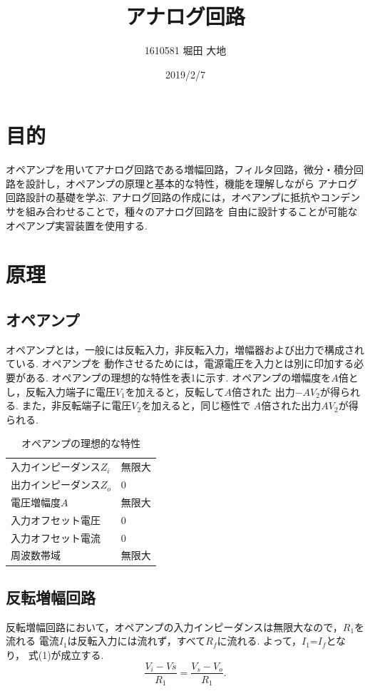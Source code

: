\documentclass[twocolumn, 10pt,a4j]{jsarticle}
\title{\vspace{-2.5cm}アナログ回路}
\author{1610581 堀田 大地}
\date{2019/2/7}
\begin{document}
\maketitle{}
\section{目的}
  オペアンプを用いてアナログ回路である増幅回路，フィルタ回路，微分・積分回路を設計し，オペアンプの原理と基本的な特性，機能を理解しながら
  アナログ回路設計の基礎を学ぶ. アナログ回路の作成には，オペアンプに抵抗やコンデンサを組み合わせることで，種々のアナログ回路を
  自由に設計することが可能なオペアンプ実習装置を使用する.

\section{原理}
  \subsection{オペアンプ}
  オペアンプとは，一般には反転入力，非反転入力，増幅器および出力で構成されている. オペアンプを
  動作させるためには，電源電圧を入力とは別に印加する必要がある. オペアンプの理想的な特性を表1に示す.
  オペアンプの増幅度を$A$倍とし，反転入力端子に電圧$V_{1}$を加えると，反転して$A$倍された
  出力$-AV_{2}$が得られる. また，非反転端子に電圧$V_{2}$を加えると，同じ極性で
  $A倍$された出力$AV_{2}$が得られる.

    \begin{table}[H]
      \centering
      \caption{オペアンプの理想的な特性}
      \label{opeanpu_risouteki_tokusei}
      \begin{tabular}{ll} \hline
      入力インピーダンス$Z_{i}$   & 無限大  \\
      出力インピーダンス$Z_{o}$   & 0    \\
      電圧増幅度$A$           & 無限大  \\
      入力オフセット電圧          & 0    \\
      入力オフセット電流          & 0    \\
      周波数帯域              & 無限大  \\ \hline
      \end{tabular}
    \end{table}


  \subsection{反転増幅回路}
    反転増幅回路において，オペアンプの入力インピーダンスは無限大なので，$R_{1}$を流れる
    電流$I_{1}$は反転入力には流れず，すべて$R_{f}$に流れる. よって，$I_{1}$=$I_{f}$となり，
    式(1)が成立する.
      \begin{equation}
        \frac{V_{i} - V{s}}{R_{1}} = \frac{V_{s} - V_{o}}{R_{1}}.
      \end{equation}
\end{document}
